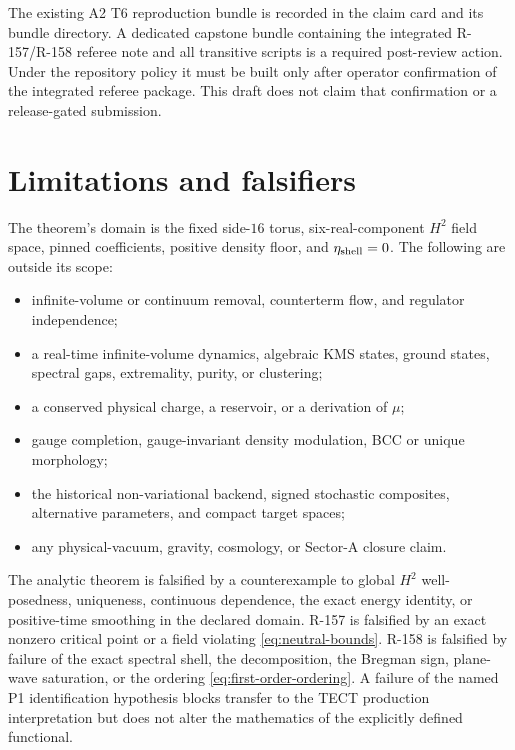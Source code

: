\documentclass[11pt]{article}
\numberwithin{equation}{section}
\theoremstyle{definition}
\begin{document}
The existing A2 T6 reproduction bundle is recorded in the claim card and its
bundle directory.  A dedicated capstone bundle containing the integrated
R-157/R-158 referee note and all transitive scripts is a required
post-review action.  Under the repository policy it must be built only after
operator confirmation of the integrated referee package.  This draft does not
claim that confirmation or a release-gated submission.

\section{Limitations and falsifiers}
\label{sec:limitations}

The theorem's domain is the fixed side-$16$ torus, six-real-component $H^2$
field space, pinned coefficients, positive density floor, and $\eta_{\rm
shell}=0$.  The following are outside its scope:
\begin{itemize}
\item infinite-volume or continuum removal, counterterm flow, and regulator
      independence;
\item a real-time infinite-volume dynamics, algebraic KMS states, ground
      states, spectral gaps, extremality, purity, or clustering;
\item a conserved physical charge, a reservoir, or a derivation of $\mu$;
\item gauge completion, gauge-invariant density modulation, BCC or unique
      morphology;
\item the historical non-variational backend, signed stochastic composites,
      alternative parameters, and compact target spaces;
\item any physical-vacuum, gravity, cosmology, or Sector-A closure claim.
\end{itemize}

The analytic theorem is falsified by a counterexample to global $H^2$
well-posedness, uniqueness, continuous dependence, the exact energy identity,
or positive-time smoothing in the declared domain.  R-157 is falsified by an
exact nonzero critical point or a field violating \eqref{eq:neutral-bounds}.
R-158 is falsified by failure of the exact spectral shell, the decomposition,
the Bregman sign, plane-wave saturation, or the ordering
\eqref{eq:first-order-ordering}.  A failure of the named P1 identification
hypothesis blocks transfer to the TECT production interpretation but does not
alter the mathematics of the explicitly defined functional.
\end{document}
